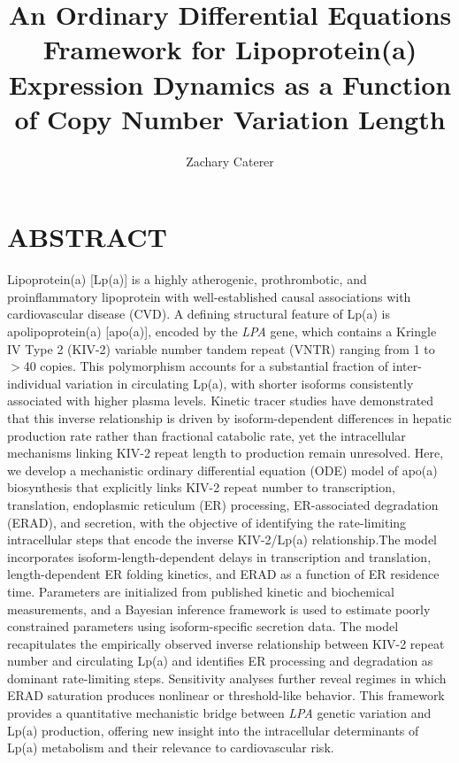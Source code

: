 \documentclass[12pt,letterpaper]{article}
\title{\Large An Ordinary Differential Equations Framework for Lipoprotein(a) Expression Dynamics as a Function of Copy Number Variation Length}
\date{}
\author[1,2,* \orcidlink{0000-0001-9019-0730}]{Zachary Caterer}
\affil[1]{Department of Chemical and Biological Engineering, University of Colorado Boulder, Boulder CO, USA}
\affil[2]{Department of Biomedical Informatics, University of Colorado Anschutz, Aurora, CO, USA}
\affil[*]{Correspondence: ztcaterer@colorado.edu}
\makeatletter
\renewcommand{\maketitle}{\bgroup\setlength{\parindent}{0pt}
\begin{flushleft}
  \textbf{\@title}
  
  \@author
\end{flushleft}\egroup}
\makeatother
\begin{document}
\sloppy

\maketitle

\section*{ABSTRACT}

Lipoprotein(a) [Lp(a)] is a highly atherogenic, prothrombotic, and proinflammatory lipoprotein with well-established causal associations with cardiovascular disease (CVD). A defining structural feature of Lp(a) is apolipoprotein(a) [apo(a)], encoded by the \textit{LPA} gene, which contains a Kringle IV Type 2 (KIV-2) variable number tandem repeat (VNTR) ranging from 1 to $>$40 copies. This polymorphism accounts for a substantial fraction of inter-individual variation in circulating Lp(a), with shorter isoforms consistently associated with higher plasma levels. Kinetic tracer studies have demonstrated that this inverse relationship is driven by isoform-dependent differences in hepatic production rate rather than fractional catabolic rate, yet the intracellular mechanisms linking KIV-2 repeat length to production remain unresolved. Here, we develop a mechanistic ordinary differential equation (ODE) model of apo(a) biosynthesis that explicitly links KIV-2 repeat number to transcription, translation, endoplasmic reticulum (ER) processing, ER-associated degradation (ERAD), and secretion, with the objective of identifying the rate-limiting intracellular steps that encode the inverse KIV-2/Lp(a) relationship.The model incorporates isoform-length-dependent delays in transcription and translation, length-dependent ER folding kinetics, and ERAD as a function of ER residence time. Parameters are initialized from published kinetic and biochemical measurements, and a Bayesian inference framework is used to estimate poorly constrained parameters using isoform-specific secretion data. The model recapitulates the empirically observed inverse relationship between KIV-2 repeat number and circulating Lp(a) and identifies ER processing and degradation as dominant rate-limiting steps. Sensitivity analyses further reveal regimes in which ERAD saturation produces nonlinear or threshold-like behavior. This framework provides a quantitative mechanistic bridge between \textit{LPA} genetic variation and Lp(a) production, offering new insight into the intracellular determinants of Lp(a) metabolism and their relevance to cardiovascular risk.
\end{document}
